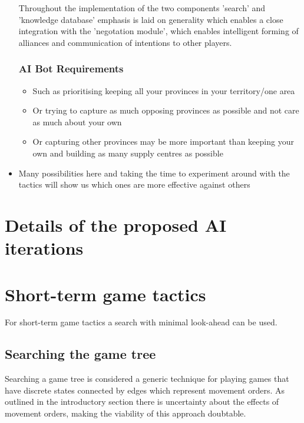 \documentclass[12pt]{article}
\begin{document}
\begin{itemize}
Throughout the implementation of the two components 'search' and 'knowledge 
database' emphasis is laid on generality which enables a close integration
with the 'negotation module', which enables intelligent forming of 
alliances and communication of intentions to other players.

\subsubsection{AI Bot Requirements}

\begin{itemize}
\item Such as prioritising keeping all your provinces in your territory/one
area
\item Or trying to capture as much opposing provinces as possible and not
care as much about your own
\item Or capturing other provinces may be more important than keeping your
own and building as many supply centres as possible

\end{itemize}
\item Many possibilities here and taking the time to experiment around with
the tactics will show us which ones are more effective against others
\end{itemize}


\section{Details of the proposed AI iterations}

\section{Short-term game tactics}

For short-term game tactics a search with minimal look-ahead can be used.

\subsection{Searching the game tree}

Searching a game tree is considered a generic technique for playing 
games that have discrete states connected by edges which represent movement
orders. As outlined in the introductory section there is uncertainty about
the effects of movement orders, making the viability of this approach doubtable. 
\end{document}
